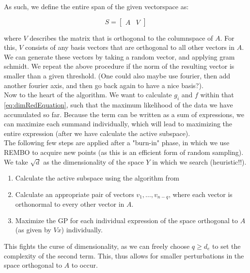 As such, we define the entire span of the given vectorspace as:

\begin{equation}
S = 
\begin{bmatrix}
A & V
\end{bmatrix}
\label{eq:entireSubspace}
\end{equation}

where $V$ describes the matrix that is orthogonal to the columnspace of $A$.
For this, $V$ consists of any basis vectors that are orthogonal to all other vectors in $A$.\\

We can generate these vectors by taking a random vector, and applying gram schmidt.
We repeat the above procedure if the norm of the resulting vector is smaller than a given threshold.
 (One could also maybe use fourier, then add another fourier axis, and then go back again to have a nice basis?). \\
 
 Now to the heart of the algorithm. 
 We want to calculate $g_i$ and $f$ within that \ref{eq:dimRedEquation}, such that the maximum likelihood of the data we have accumulated so far.
 Because the term can be written as a sum of expressions, we can maximize each summand individually, which will lead to maximizing the entire expression (after we have calculate the active subspace). \\
 
 The following few steps are applied after a "burn-in" phase, in which we use REMBO to acquire new points (as this is an efficient form of random sampling).
 We take $ \sqrt{d} $ as the dimensionality of the space $Y$ in which we search (heuristic!!).
 
 \begin{enumerate}
 \item Calculate the active subspace using the algorithm from 
 \item Calculate an appropriate pair of vectors $v_1, \ldots, v_{n-{q}}$, where each vector is orthonormal to every other vector in $A$.
 \item Maximize the GP for each individual expression of the space orthogonal to $A$ (as given by $V x$) individually.
 \end{enumerate}
 
 This fights the curse of dimensionality, as we can freely choose $q \geq d_e$ to set the complexity of the second term.
 This, thus allows for smaller perturbations in the space orthogonal to $A$ to occur.

